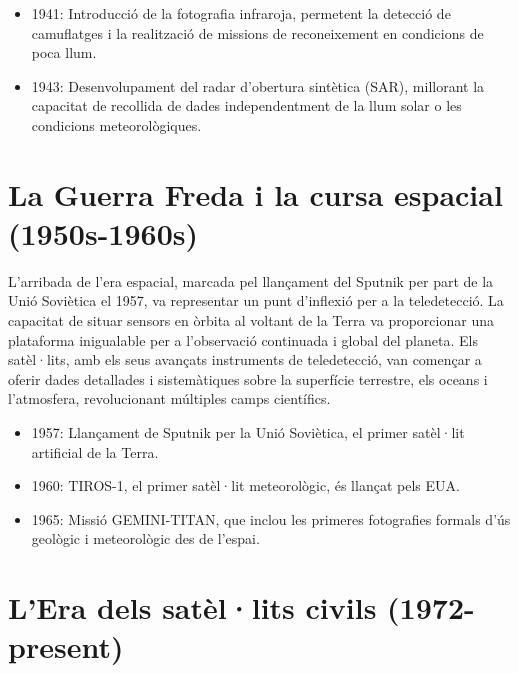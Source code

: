 \documentclass[
]{book}
\providecommand{\tightlist}{%
  \setlength{\itemsep}{0pt}\setlength{\parskip}{0pt}}
\begin{document}
\begin{itemize}
\tightlist
\item
  1941: Introducció de la fotografia infraroja, permetent la detecció de camuflatges i la realització de missions de reconeixement en condicions de poca llum.
\item
  1943: Desenvolupament del radar d'obertura sintètica (SAR), millorant la capacitat de recollida de dades independentment de la llum solar o les condicions meteorològiques.
\end{itemize}

\hypertarget{la-guerra-freda-i-la-cursa-espacial-1950s-1960s}{%
\section{La Guerra Freda i la cursa espacial (1950s-1960s)}\label{la-guerra-freda-i-la-cursa-espacial-1950s-1960s}}

L'arribada de l'era espacial, marcada pel llançament del Sputnik per part de la Unió Soviètica el 1957, va representar un punt d'inflexió per a la teledetecció. La capacitat de situar sensors en òrbita al voltant de la Terra va proporcionar una plataforma inigualable per a l'observació continuada i global del planeta. Els satèl·lits, amb els seus avançats instruments de teledetecció, van començar a oferir dades detallades i sistemàtiques sobre la superfície terrestre, els oceans i l'atmosfera, revolucionant múltiples camps científics.

\begin{itemize}
\tightlist
\item
  1957: Llançament de Sputnik per la Unió Soviètica, el primer satèl·lit artificial de la Terra.
\item
  1960: TIROS-1, el primer satèl·lit meteorològic, és llançat pels EUA.
\item
  1965: Missió GEMINI-TITAN, que inclou les primeres fotografies formals d'ús geològic i meteorològic des de l'espai.
\end{itemize}

\hypertarget{lera-dels-satuxe8llits-civils-1972-present}{%
\section{L'Era dels satèl·lits civils (1972-present)}\label{lera-dels-satuxe8llits-civils-1972-present}}
\end{document}
